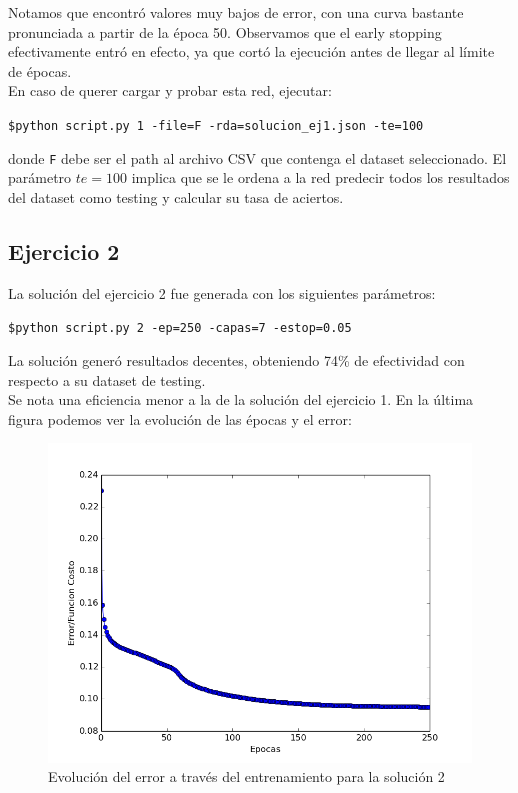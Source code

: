 Notamos que encontró valores muy bajos de error, con una curva bastante pronunciada a partir de la época 50. Observamos que el early stopping efectivamente entró en efecto, ya que cortó la ejecución antes de llegar al límite de épocas.\\

En caso de querer cargar y probar esta red, ejecutar:

\texttt{\$python script.py 1 -file=F -rda=solucion\_ej1.json -te=100 }

donde \texttt{F} debe ser el path al archivo CSV que contenga el dataset seleccionado. El parámetro $te=100$ implica que se le ordena a la red predecir todos los resultados del dataset como testing y calcular su tasa de aciertos.

\subsection{Ejercicio 2}
La solución del ejercicio 2 fue generada con los siguientes parámetros:

\texttt{\$python script.py 2 -ep=250 -capas=7 -estop=0.05}

La solución generó resultados decentes, obteniendo 74\% de efectividad con respecto a su dataset de testing.\\
Se nota una eficiencia menor a la de la solución del ejercicio 1.
En la última figura podemos ver la evolución de las épocas y el error:

\begin{figure}[h]
  \begin{center}
  \includegraphics[scale=0.50]{graficos/solucion_ej2.png}
  \caption{Evolución del error a través del entrenamiento para la solución 2}
  \end{center}
\end{figure}

